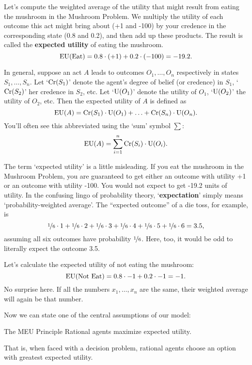 Let's compute the weighted average of the utility that might result from eating
the mushroom in the Mushroom Problem. We multiply the utility of each outcome
this act might bring about (+1 and -100) by your credence in the corresponding
state (0.8 and 0.2), and then add up these products. The result is called the
\textbf{expected utility} of eating the mushroom.
\[
\text{EU}(\text{Eat}) = 0.8 \cdot (+1) + 0.2 \cdot (-100) = -19.2.
\]

In general, suppose an act $A$ leads to outcomes $O_1,\ldots,O_n$ respectively
in states $S_1,\ldots, S_n$. Let `$\text{Cr}(S_1)$' denote the agent's degree of
belief (or credence) in $S_1$, `$\text{Cr}(S_2)$' her credence in $S_2$, etc. Let
`$\text{U}(O_1)$' denote the utility of $O_1$, `$\text{U}(O_2)$' the utility of $O_2$, etc.
Then the expected utility of $A$ is defined as
\[
\text{EU}(A) = \text{Cr}(S_1) \cdot \text{U}(O_1) + \ldots + \text{Cr}(S_n) \cdot \text{U}(O_n).
\]
You'll often see this abbreviated using the `sum' symbol $\sum$:
\[
\text{EU}(A) = \sum_{i=1}^n \text{Cr}(S_i) \cdot \text{U}(O_i).
\]

The term `expected utility' is a little misleading. If you eat the mushroom in
the Mushroom Problem, you are guaranteed to get either an outcome with utility
+1 or an outcome with utility -100. You would not expect to get -19.2 units
of utility. In the confusing lingo of probability theory, `\textbf{expectation}'
simply means `probability-weighted average'. The ``expected outcome'' of a die
toss, for example, is
\[
  \nicefrac{1}{6} \cdot 1 +
  \nicefrac{1}{6} \cdot 2 +
  \nicefrac{1}{6} \cdot 3 +
  \nicefrac{1}{6} \cdot 4 +
  \nicefrac{1}{6} \cdot 5 +
  \nicefrac{1}{6} \cdot 6 = 3.5,
\]
assuming all six outcomes have probability $\nicefrac{1}{6}$. Here, too, it
would be odd to literally expect the outcome 3.5.

Let's calculate the expected utility of not eating the mushroom:
\[
\text{EU}(\text{Not Eat}) = 0.8 \cdot -1 + 0.2 \cdot -1 = -1.
\]
No surprise here. If all the numbers $x_1,\ldots,x_n$ are the same,
their weighted average will again be that number.

Now we can state one of the central assumptions of our model:

\begin{genericthm}{The MEU Principle}
  Rational agents maximize expected utility. 
\end{genericthm}
%
\noindent%
That is, when faced with a decision problem, rational agents choose an
option with greatest expected utility.


